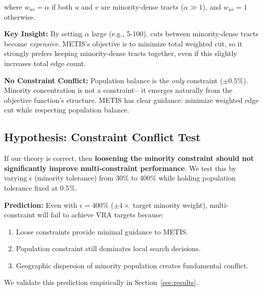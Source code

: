 where $w_{uv} = \alpha$ if both $u$ and $v$ are minority-dense tracts ($\alpha \gg 1$), and $w_{uv} = 1$ otherwise.

\textbf{Key Insight:} By setting $\alpha$ large (e.g., 5-100), cuts between minority-dense tracts become \textit{expensive}. METIS's objective is to minimize total weighted cut, so it strongly prefers keeping minority-dense tracts together, even if this slightly increases total edge count.

\textbf{No Constraint Conflict:} Population balance is the \textit{only} constraint ($\pm0.5\%$). Minority concentration is not a constraint---it emerges naturally from the objective function's structure. METIS has clear guidance: minimize weighted edge cut while respecting population balance.

\subsection{Hypothesis: Constraint Conflict Test}

If our theory is correct, then \textbf{loosening the minority constraint should not significantly improve multi-constraint performance}. We test this by varying $\epsilon$ (minority tolerance) from 30\% to 400\% while holding population tolerance fixed at 0.5\%.

\textbf{Prediction:} Even with $\epsilon = 400\%$ ($\pm4\times$ target minority weight), multi-constraint will fail to achieve VRA targets because:
\begin{enumerate}
    \item Loose constraints provide minimal guidance to METIS.
    \item Population constraint still dominates local search decisions.
    \item Geographic dispersion of minority population creates fundamental conflict.
\end{enumerate}

We validate this prediction empirically in Section~\ref{sec:results}.
